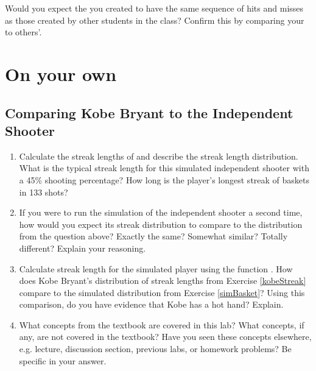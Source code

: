 \documentclass[11pt]{article}
\begin{document}
\begin{exercise}
Would you expect the  you created to have the same sequence of hits and misses as those created by other students in the class? Confirm this by comparing your  to others'.
\end{exercise}

\pagebreak

\section*{On your own}
\subsection*{Comparing Kobe Bryant to the Independent Shooter}

\begin{enumerate}
\item Calculate the streak lengths of  and describe the streak length distribution.  What is the typical streak length for this simulated independent shooter with a 45\% shooting percentage?  How long is the player's longest streak of baskets in 133 shots?

\item If you were to run the simulation of the independent shooter a second time, how would you expect its streak distribution to compare to the distribution from the question above?  Exactly the same?  Somewhat similar?  Totally different?  Explain your reasoning.

\item Calculate streak length for the simulated player using the function . How does Kobe Bryant's distribution of streak lengths from Exercise \ref{kobeStreak} compare to the simulated distribution from Exercise \ref{simBasket}?  Using this comparison, do you have evidence that Kobe has a hot hand? Explain.

\item What concepts from the textbook are covered in this lab?  What concepts, if any, are not covered in the textbook?  Have you seen these concepts elsewhere, e.g. lecture, discussion section, previous labs, or homework problems?  Be specific in your answer.
\end{enumerate}


\vfill


\theendnotes
\end{document}
